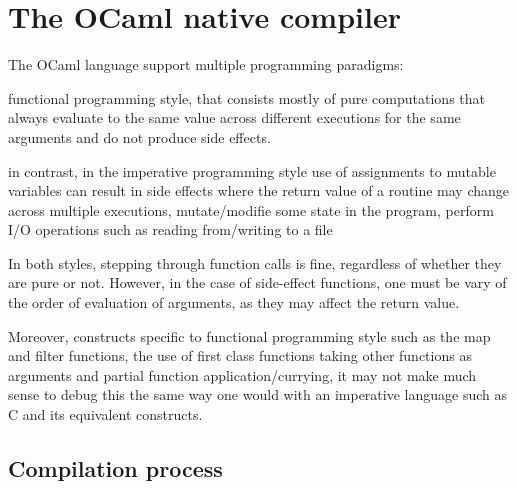 \chapter{The OCaml native compiler\label{cha:chapter3}}

The OCaml language support multiple programming paradigms:

functional programming style, that consists mostly of pure computations that always
evaluate to the same value across different executions for the same arguments
and do not produce side effects.

in contrast, in the imperative programming style
use of assignments to mutable variables can result in side effects
where the return value of a routine may change across multiple executions,
mutate/modifie some state in the program, perform I/O operations
such as reading from/writing to a file

In both styles, stepping through function calls is fine, regardless of whether
they are pure or not.
However, in the case of side-effect functions, one must be vary of the order of
evaluation of arguments, as they may affect the return value.

Moreover, constructs specific to functional programming style such as the map
and filter functions, the use of first class functions taking other functions as
arguments and partial function application/currying,
it may not make much sense to debug this the same way one would with
an imperative language such as C and its equivalent constructs.

\section{Compilation process}

\begin{figure}
  \centering
{}
\end{figure}

